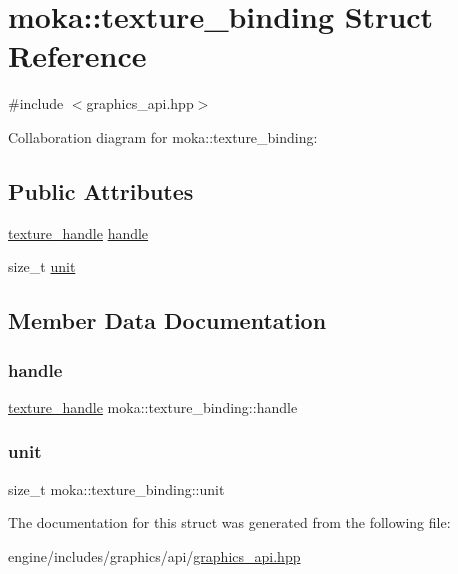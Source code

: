\hypertarget{structmoka_1_1texture__binding}{}\section{moka\+::texture\+\_\+binding Struct Reference}
\label{structmoka_1_1texture__binding}


{\ttfamily \#include $<$graphics\+\_\+api.\+hpp$>$}



Collaboration diagram for moka\+::texture\+\_\+binding\+:
\subsection*{Public Attributes}
\begin{DoxyCompactItemize}
\item 
\mbox{\hyperlink{structmoka_1_1texture__handle}{texture\+\_\+handle}} \mbox{\hyperlink{structmoka_1_1texture__binding_a79d38d67bd925c6d20f4e2c88e5289ad}{handle}}
\item 
size\+\_\+t \mbox{\hyperlink{structmoka_1_1texture__binding_a03ecfc14edadf93d7d25788566d6ab8f}{unit}}
\end{DoxyCompactItemize}


\subsection{Member Data Documentation}
\mbox{\label{structmoka_1_1texture__binding_a79d38d67bd925c6d20f4e2c88e5289ad}} 
\subsubsection{\texorpdfstring{handle}{handle}}
{\footnotesize\ttfamily \mbox{\hyperlink{structmoka_1_1texture__handle}{texture\+\_\+handle}} moka\+::texture\+\_\+binding\+::handle}

\mbox{\label{structmoka_1_1texture__binding_a03ecfc14edadf93d7d25788566d6ab8f}} 
\subsubsection{\texorpdfstring{unit}{unit}}
{\footnotesize\ttfamily size\+\_\+t moka\+::texture\+\_\+binding\+::unit}



The documentation for this struct was generated from the following file\+:\begin{DoxyCompactItemize}
\item 
engine/includes/graphics/api/\mbox{\hyperlink{graphics__api_8hpp}{graphics\+\_\+api.\+hpp}}\end{DoxyCompactItemize}
